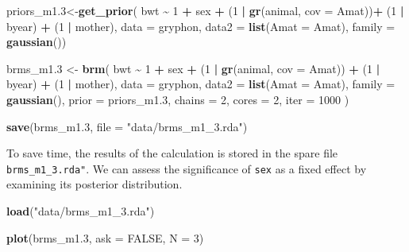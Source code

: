 \documentclass[
  12pt,
]{book}
\newenvironment{Shaded}{\begin{snugshade}}{\end{snugshade}}
\newcommand{\DataTypeTok}[1]{\textcolor[rgb]{0.13,0.29,0.53}{#1}}
\newcommand{\DecValTok}[1]{\textcolor[rgb]{0.00,0.00,0.81}{#1}}
\newcommand{\FloatTok}[1]{\textcolor[rgb]{0.00,0.00,0.81}{#1}}
\newcommand{\KeywordTok}[1]{\textcolor[rgb]{0.13,0.29,0.53}{\textbf{#1}}}
\newcommand{\NormalTok}[1]{#1}
\newcommand{\OperatorTok}[1]{\textcolor[rgb]{0.81,0.36,0.00}{\textbf{#1}}}
\newcommand{\OtherTok}[1]{\textcolor[rgb]{0.56,0.35,0.01}{#1}}
\newcommand{\StringTok}[1]{\textcolor[rgb]{0.31,0.60,0.02}{#1}}
\begin{document}
\begin{Shaded}
\begin{Highlighting}[]
\NormalTok{priors\_m1}\FloatTok{.3}\NormalTok{\textless{}{-}}\KeywordTok{get\_prior}\NormalTok{( bwt }\OperatorTok{\textasciitilde{}}\StringTok{ }\DecValTok{1} \OperatorTok{+}\StringTok{ }\NormalTok{sex }\OperatorTok{+}\StringTok{ }\NormalTok{(}\DecValTok{1} \OperatorTok{|}\StringTok{ }\KeywordTok{gr}\NormalTok{(animal, }\DataTypeTok{cov =}\NormalTok{ Amat))}\OperatorTok{+}\StringTok{ }\NormalTok{(}\DecValTok{1} \OperatorTok{|}\StringTok{ }\NormalTok{byear) }\OperatorTok{+}\StringTok{ }\NormalTok{(}\DecValTok{1} \OperatorTok{|}\StringTok{ }\NormalTok{mother),}
  \DataTypeTok{data =}\NormalTok{ gryphon,}
  \DataTypeTok{data2 =} \KeywordTok{list}\NormalTok{(}\DataTypeTok{Amat =}\NormalTok{ Amat),}
  \DataTypeTok{family =} \KeywordTok{gaussian}\NormalTok{())  }
  
\NormalTok{brms\_m1}\FloatTok{.3}\NormalTok{ \textless{}{-}}\StringTok{ }\KeywordTok{brm}\NormalTok{(}
\NormalTok{  bwt }\OperatorTok{\textasciitilde{}}\StringTok{ }\DecValTok{1} \OperatorTok{+}\StringTok{ }\NormalTok{sex }\OperatorTok{+}\StringTok{ }\NormalTok{(}\DecValTok{1} \OperatorTok{|}\StringTok{ }\KeywordTok{gr}\NormalTok{(animal, }\DataTypeTok{cov =}\NormalTok{ Amat)) }\OperatorTok{+}\StringTok{ }\NormalTok{(}\DecValTok{1} \OperatorTok{|}\StringTok{ }\NormalTok{byear) }\OperatorTok{+}\StringTok{ }\NormalTok{(}\DecValTok{1} \OperatorTok{|}\StringTok{ }\NormalTok{mother),}
  \DataTypeTok{data =}\NormalTok{ gryphon,}
  \DataTypeTok{data2 =} \KeywordTok{list}\NormalTok{(}\DataTypeTok{Amat =}\NormalTok{ Amat),}
  \DataTypeTok{family =} \KeywordTok{gaussian}\NormalTok{(),}
  \DataTypeTok{prior =}\NormalTok{ priors\_m1}\FloatTok{.3}\NormalTok{,}
  \DataTypeTok{chains =} \DecValTok{2}\NormalTok{, }\DataTypeTok{cores =} \DecValTok{2}\NormalTok{, }\DataTypeTok{iter =} \DecValTok{1000}
\NormalTok{)}

\KeywordTok{save}\NormalTok{(brms\_m1}\FloatTok{.3}\NormalTok{, }\DataTypeTok{file =} \StringTok{"data/brms\_m1\_3.rda"}\NormalTok{)}
\end{Highlighting}
\end{Shaded}

To save time, the results of the calculation is stored in the spare file \texttt{brms\_m1\_3.rda"}.
We can assess the significance of \texttt{sex} as a fixed effect by examining its posterior distribution.

\begin{Shaded}
\begin{Highlighting}[]
\KeywordTok{load}\NormalTok{(}\StringTok{"data/brms\_m1\_3.rda"}\NormalTok{)}

\KeywordTok{plot}\NormalTok{(brms\_m1}\FloatTok{.3}\NormalTok{, }\DataTypeTok{ask =} \OtherTok{FALSE}\NormalTok{, }\DataTypeTok{N =} \DecValTok{3}\NormalTok{)}
\end{Highlighting}
\end{Shaded}
\end{document}
